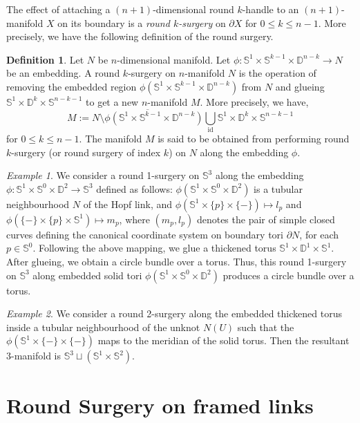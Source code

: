 \documentclass{amsart}
\theoremstyle{plain}
\theoremstyle{remark}
\newtheorem{exm}{Example}
\theoremstyle{definition}
\newtheorem{defn}{Definition}
\newcommand{\s}{\mathbb{S}}
\newcommand{\D}{\mathbb{D}}
\newcommand{\dd}{\partial}
\begin{document}
The effect of attaching a $(n+1)$-dimensional round $k$-handle to an $(n+1)$-manifold $X$ on its boundary is a {\it round $k$-surgery} on $\dd X$ for $0\leq k\leq n-1$. More precisely, we have the following definition of the round surgery.
\begin{defn}
Let $N$ be $n$-dimensional manifold. Let $\phi : \s^1 \times \s^{k-1} \times \D^{n-k} \to N $ be an embedding. 
A round $k$-surgery on $n$-manifold $N$ is the operation of removing the embedded region $\phi\left(\s^1 \times \s^{k-1} \times \D^{n-k}\right) $ from $N$ and glueing $\s^1 \times \D^{k} \times \s^{n-k-1}$ to get a new $n$-manifold $M$. More precisely, we have, 
$$M := \overline{N \setminus \phi(\s^1 \times \s^{k-1}\times \D^{n-k})} \bigcup_{\text{id}} \s^1 \times \D^{k} \times \s^{n-k-1}$$
for $0\leq k\leq n-1$. The manifold $M$ is said to be obtained from performing round $k$-surgery (or round surgery of index $k$) on $N$ along the embedding $\phi$. 
\end{defn}

\begin{exm}\label{ex: R1S-3-torus}
We consider a round 1-surgery on $\s^3$ along the embedding $\phi: \s^1\times \s^0 \times \D^2 \to \s^3$ defined as follows: $\phi (\s^1 \times \s^0 \times \D^2)$ is a tubular neighbourhood $N$ of the Hopf link, and $\phi(\s^1 \times \{p\} \times \{-\}) \mapsto l_{p}$ and $\phi(\{-\} \times \{p\} \times \s^1) \mapsto m_{p}$, where $(m_p, l_p)$ denotes the pair of simple closed curves defining the canonical coordinate system on boundary tori $\dd N$, for each $p \in \s^0$. 
Following the above mapping, we glue a thickened torus $\s^1 \times \D^1\times \s^1$. After glueing, we obtain a circle bundle over a torus. %
Thus, this round 1-surgery on $\s^3$ along embedded solid tori $\phi (\s^1 \times \s^0 \times \D^2)$ produces a circle bundle over a torus. %
\end{exm}

\begin{exm}\label{ex: R2S-s3U(s1xs2)}
We consider a round 2-surgery along the embedded thickened torus inside a tubular neighbourhood of the unknot $N(U)$ such that the $\phi(\s^1 \times \{-\} \times \{-\})$ maps to the meridian of the solid torus. 
Then the resultant $3$-manifold is $\s^3 \sqcup (\s^1 \times \s^2)$.
\end{exm}



\section{Round Surgery on framed links}\label{Sec: RSDs}
\end{document}
